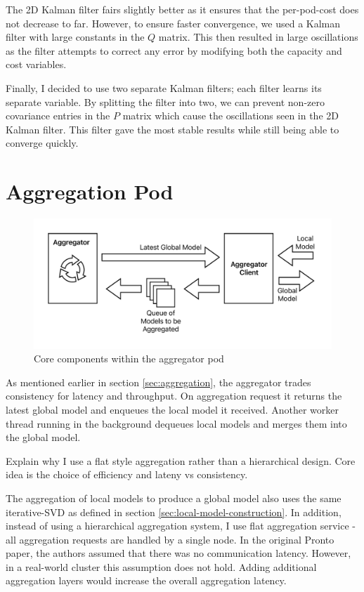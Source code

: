 The 2D Kalman filter fairs slightly better as it ensures that the per-pod-cost
does not decrease to far. However, to ensure faster convergence, we used a
Kalman filter with large constants in the $Q$ matrix. This then resulted in
large oscillations as the filter attempts to correct any error by modifying both
the capacity and cost variables.

Finally, I decided to use two separate Kalman filters; each filter learns its
separate variable. By splitting the filter into two, we can prevent non-zero
covariance entries in the $P$ matrix which cause the oscillations seen in the 2D
Kalman filter. This filter gave the most stable results while still being able
to converge quickly.

\section{Aggregation Pod}
\begin{figure}[H]
    \centering
    \includegraphics[width=\textwidth]{images/pronto-agg.pdf}
    \caption{Core components within the aggregator pod}
    \label{spazio-agg-components}
\end{figure}

As mentioned earlier in section \ref{sec:aggregation}, the aggregator trades
consistency for latency and throughput. On aggregation request it returns the
latest global model and enqueues the local model it received. Another worker
thread running in the background dequeues local models and merges them into the
global model.

Explain why I use a flat style aggregation rather than a hierarchical design.
Core idea is the choice of efficiency and lateny vs consistency.

The aggregation of local models to produce a global model also uses the same
iterative-SVD as defined in section \ref{sec:local-model-construction}. In
addition, instead of using a hierarchical aggregation system, I use flat
aggregation service - all aggregation requests are handled by a single node.
In the original Pronto paper, the authors assumed that there was no
communication latency. However, in a real-world cluster this assumption does not
hold. Adding additional aggregation layers would increase the overall aggregation
latency.

